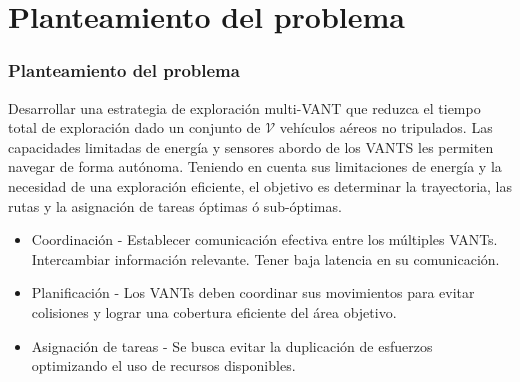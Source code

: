 \documentclass[
	12pt, %
	aspectratio=169, %
]{beamer}
\begin{document}
\section{Planteamiento del problema}

\begin{frame}
  \frametitle{Planteamiento del problema}
  Desarrollar una estrategia de exploración multi-VANT que reduzca el tiempo total de exploración dado un conjunto de $\mathcal{V}$ vehículos aéreos no tripulados. Las capacidades limitadas de energía y sensores abordo de los VANTS les permiten navegar de forma autónoma. Teniendo en cuenta sus limitaciones de energía y la necesidad de una exploración eficiente, el objetivo es determinar la trayectoria, las rutas y la asignación de tareas óptimas ó sub-óptimas.
  \bigskip %
  \begin{itemize}
  \item<1-> Coordinación - Establecer comunicación efectiva entre los múltiples VANTs. Intercambiar información relevante. Tener baja latencia en su comunicación.
  \item<2-> Planificación - Los VANTs deben coordinar sus movimientos para evitar colisiones y lograr una cobertura eficiente del área objetivo.
  \item<3-> Asignación de tareas - Se busca evitar la duplicación de esfuerzos optimizando el uso de recursos disponibles.
  \end{itemize}
  
\end{frame}

\end{document}
